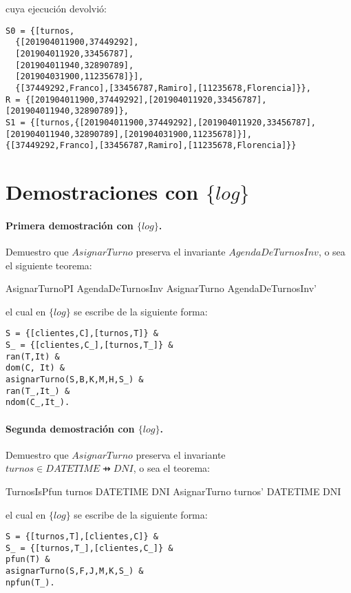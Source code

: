 \documentclass[%
  fleqn,colorlinks,linkcolor=blue,citecolor=blue,urlcolor=blue]{eptcs}
\newcommand{\setlog}{$\{log\}$\xspace}
\begin{document}
cuya ejecuci\'on devolvi\'o:

\begin{verbatim}
S0 = {[turnos,
  {[201904011900,37449292],
  [201904011920,33456787],
  [201904011940,32890789],
  [201904031900,11235678]}],
  {[37449292,Franco],[33456787,Ramiro],[11235678,Florencia]}},
R = {[201904011900,37449292],[201904011920,33456787],[201904011940,32890789]},
S1 = {[turnos,{[201904011900,37449292],[201904011920,33456787],
[201904011940,32890789],[201904031900,11235678]}],
{[37449292,Franco],[33456787,Ramiro],[11235678,Florencia]}}
\end{verbatim}

\section{Demostraciones con \setlog}

\paragraph{Primera demostraci\'on con \setlog.}

Demuestro que $AsignarTurno$ preserva el invariante $AgendaDeTurnosInv$, o sea el siguiente teorema:
\begin{theorem}{AsignarTurnoPI}
AgendaDeTurnosInv \land AsignarTurno \implies AgendaDeTurnosInv'
\end{theorem}
el cual en \setlog se escribe de la siguiente forma:
\begin{verbatim}
S = {[clientes,C],[turnos,T]} &
S_ = {[clientes,C_],[turnos,T_]} &
ran(T,It) &
dom(C, It) &
asignarTurno(S,B,K,M,H,S_) &
ran(T_,It_) &
ndom(C_,It_).
\end{verbatim}

\paragraph{Segunda demostraci\'on con \setlog.}
Demuestro que $AsignarTurno$ preserva el invariante $turnos \in DATETIME \pfun DNI$, o sea el teorema:
\begin{theorem}{TurnosIsPfun}
turnos \in  DATETIME \pfun DNI \land AsignarTurno \implies turnos' \in DATETIME \pfun DNI
\end{theorem}
el cual en \setlog se escribe de la siguiente forma:
\begin{verbatim}
S = {[turnos,T],[clientes,C]} &
S_ = {[turnos,T_],[clientes,C_]} &
pfun(T) &
asignarTurno(S,F,J,M,K,S_) &
npfun(T_).
\end{verbatim}
\end{document}
